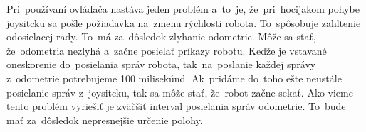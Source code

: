 Pri~používaní ovládača nastáva jeden problém a~to~je, že~pri~hocijakom pohybe joysitcku sa pošle požiadavka na~zmenu
rýchlosti robota. To~spôsobuje zahltenie odosielacej rady. To~má za~dôsledok zlyhanie odometrie. Môže sa stať,
že~odometria nezlyhá a~začne posielať príkazy robotu. Keďže je vstavané oneskorenie do~posielania správ robota,
tak~na~poslanie každej správy z~odometrie potrebujeme 100 milisekúnd. Ak~pridáme do~toho ešte neustále posielanie správ
z~joysitcku, tak sa môže stať, že~robot začne sekať. Ako vieme tento problém vyriešiť je zväčšiť interval posielania
správ odometrie. To~bude mať za~dôsledok nepresnejšie určenie polohy.

